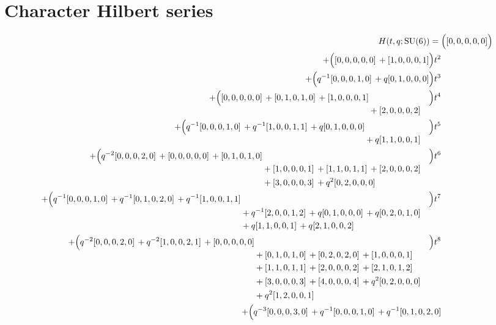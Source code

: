 \documentclass[10pt]{article}
\begin{document}
\section{Character Hilbert series}
\[
\begin{aligned}
H(t,q;\mathrm{SU}(6)) ={}&
   \Bigl([0,0,0,0,0]\Bigr) \\
  + \Bigl([0,0,0,0,0]\,+[1,0,0,0,1]\Bigr)t^{2} \\
  + \Bigl(q^{-1}[0,0,0,1,0]\,+q[0,1,0,0,0]\Bigr)t^{3} \\
  + \Bigl(\begin{aligned}[t][0,0,0,0,0]\,+[0,1,0,1,0]\,+[1,0,0,0,1] \\
  &{}+[2,0,0,0,2]\end{aligned}\Bigr)t^{4} \\
  + \Bigl(\begin{aligned}[t]q^{-1}[0,0,0,1,0]\,+q^{-1}[1,0,0,1,1]\,+q[0,1,0,0,0] \\
  &{}+q[1,1,0,0,1]\end{aligned}\Bigr)t^{5} \\
  + \Bigl(\begin{aligned}[t]q^{-2}[0,0,0,2,0]\,+[0,0,0,0,0]\,+[0,1,0,1,0] \\
  &{}+[1,0,0,0,1]\,+[1,1,0,1,1]\,+[2,0,0,0,2] \\
  &{}+[3,0,0,0,3]\,+q^{2}[0,2,0,0,0]\end{aligned}\Bigr)t^{6} \\
  + \Bigl(\begin{aligned}[t]q^{-1}[0,0,0,1,0]\,+q^{-1}[0,1,0,2,0]\,+q^{-1}[1,0,0,1,1] \\
  &{}+q^{-1}[2,0,0,1,2]\,+q[0,1,0,0,0]\,+q[0,2,0,1,0] \\
  &{}+q[1,1,0,0,1]\,+q[2,1,0,0,2]\end{aligned}\Bigr)t^{7} \\
  + \Bigl(\begin{aligned}[t]q^{-2}[0,0,0,2,0]\,+q^{-2}[1,0,0,2,1]\,+[0,0,0,0,0] \\
  &{}+[0,1,0,1,0]\,+[0,2,0,2,0]\,+[1,0,0,0,1] \\
  &{}+[1,1,0,1,1]\,+[2,0,0,0,2]\,+[2,1,0,1,2] \\
  &{}+[3,0,0,0,3]\,+[4,0,0,0,4]\,+q^{2}[0,2,0,0,0] \\
  &{}+q^{2}[1,2,0,0,1]\end{aligned}\Bigr)t^{8} \\
  + \Bigl(\begin{aligned}[t]q^{-3}[0,0,0,3,0]\,+q^{-1}[0,0,0,1,0]\,+q^{-1}[0,1,0,2,0] \\

\end{aligned}
\end{aligned}\]
\end{document}

